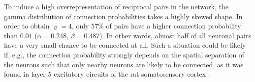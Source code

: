 




To induce a high overrepresentation of reciprocal pairs in the
network, the gamma distribution of connection probabilities takes a
highly skewed shape. In order to obtain $\varrho = 4$, only $57\%$ of
pairs have a higher connection probability than $0.01$
($\alpha=0.248$, $\beta = 0.487$). In other words, almost half of all
neuronal pairs have a very small chance to be connected at
all. Such a situation could be likely if, e.g., the connection
probability strongly depends on the spatial separation of the neurons
such that only nearby neurons are likely to be connected, as it was
found in layer 5 excitatory circuits of the rat somatosensory cortex
\cite{Perin2011}.
